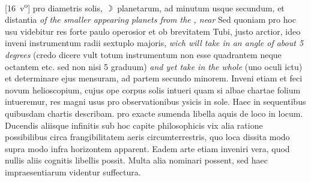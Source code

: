 [16~v\textsuperscript{o}] \textsuperscript{}  pro diametris solis\protect{}, $\rightmoon$\ planetarum, ad minutum usque secundum, et distantia \textit{of the smaller appearing planets from the }\textit{, near}  Sed quoniam pro hoc usu videbitur res forte paulo operosior et ob brevitatem Tubi, justo arctior, ideo inveni instrumentum radii sextuplo majoris, \textit{wich will take in an angle of about 5 degrees} (credo dicere vult totum instrumentum non esse quadrantem\protect{} neque octantem etc. sed non nisi 5 graduum) \textit{and yet take in the whole
%
}
(uno oculi ictu) et determinare ejus mensuram, ad partem secundo minorem. Inveni etiam et feci novum helioscopium, cujus ope corpus solis intueri  quam si albae chartae folium intueremur, res magni usus pro observationibus ysicis in sole. Haec in sequentibus quibusdam chartis describam. 
\pend 
\pstart {}\textsuperscript{} pro exacte sumenda libella aquis de loco in locum. Ducendis aliisque infinitis sub hoc capite philosophicis  vix alia ratione possibilibus circa frangibilitatem aeris circumterrestris, quo loca dissita modo supra modo infra horizontem apparent. Eadem arte etiam inveniri  vera, quod nullis aliis cognitis libellis possit. Multa alia nominari possent, sed haec impraesentiarum videntur suffectura. 
\pend
\count{}
\count{}
\count{} 